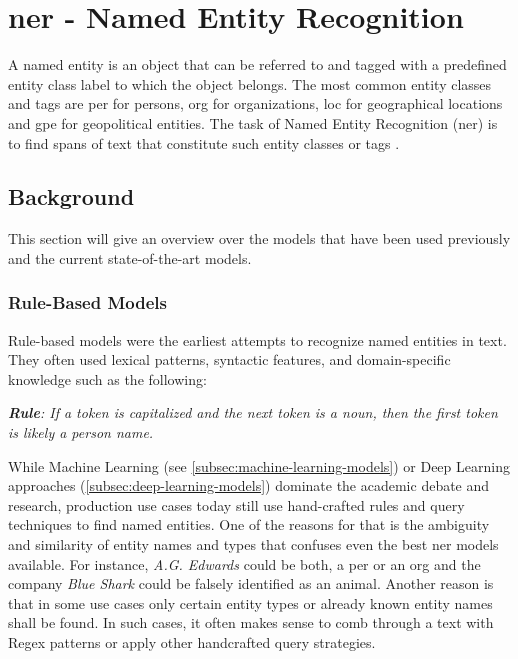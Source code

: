 \chapter{\gls{ner} - Named Entity Recognition}
A named entity is an object that can be referred to and tagged with a predefined entity class label to which the object belongs.
The most common entity classes and tags are \gls{per} for persons, \gls{org} for organizations, \gls{loc}
for geographical locations and \gls{gpe} for geopolitical entities.
The task of Named Entity Recognition (\gls{ner}) is to find \glspl{span} of text that constitute such entity classes or tags \cite{StanfordNLPNER}.

\section{Background}
This section will give an overview over the models that have been used previously and the current state-of-the-art models.
\subsection{Rule-Based Models}\label{subsec:rule-based-models}
Rule-based models were the earliest attempts to recognize named entities in text.
They often used lexical patterns, syntactic features, and domain-specific knowledge such as the following:

\begin{center}
\textit{\textbf{Rule}: If a token is capitalized and the next token is a noun, then the first token is likely a person name.}
\end{center}

While Machine Learning (see \ref{subsec:machine-learning-models}) or Deep Learning approaches (\ref{subsec:deep-learning-models})
dominate the academic debate and research, production use cases today still use hand-crafted rules and query techniques \cite{StanfordNLPNER} to find named entities.
One of the reasons for that is the ambiguity and similarity of entity names and types that confuses even the best \gls{ner} models available.
For instance, \textit{A.G. Edwards} could be both, a \gls{per} or an \gls{org} and the company \textit{Blue Shark} could be falsely identified as an animal.
Another reason is that in some use cases only certain entity types or already known entity names shall be found.
In such cases, it often makes sense to comb through a text with \gls{Regex} patterns or apply other handcrafted query strategies.

